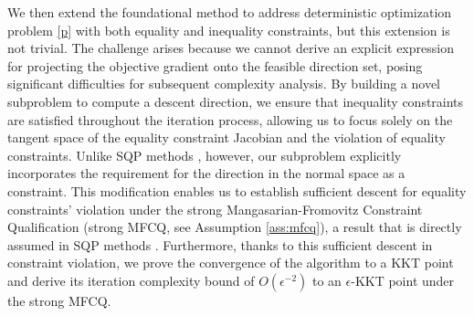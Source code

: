 \documentclass[11pt]{article}
\begin{document}
We then extend the foundational method to address deterministic optimization problem \eqref{p}  with both equality and inequality constraints, but this extension is not trivial. The challenge arises because we cannot derive an explicit expression for projecting the objective gradient onto the feasible direction {set}, posing significant difficulties for subsequent complexity analysis. %
{By building a novel  subproblem to compute a descent direction,} we ensure that inequality constraints are satisfied throughout the iteration process, allowing us to focus solely on the tangent space of the equality constraint Jacobian and the violation of equality constraints. Unlike SQP methods \cite{curtis2024sequential}, however, our subproblem explicitly incorporates the requirement for the direction {in the normal space as a constraint}. This modification enables us to establish sufficient descent for {equality} constraints' violation under the strong Mangasarian-Fromovitz Constraint Qualification (strong MFCQ, see Assumption \ref{ass:mfcq}), a result that is directly assumed in SQP methods \cite{curtis2024sequential}. Furthermore, thanks to this sufficient descent in constraint violation, we prove  the convergence of the algorithm to a {KKT point} and derive its iteration complexity bound of \(O(\epsilon^{-2})\) {to an $\epsilon$-KKT point} under the strong MFCQ.
\end{document}
